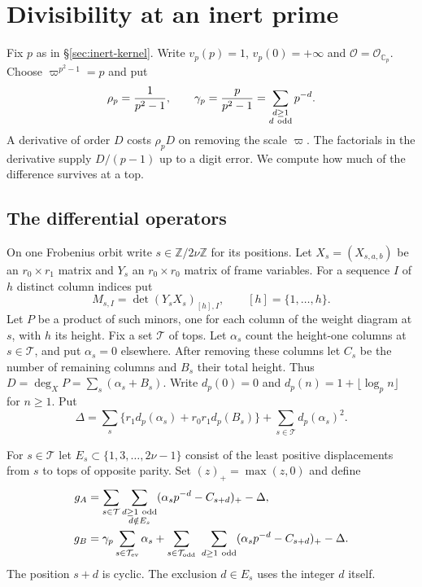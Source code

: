 \section{Divisibility at an inert prime}\label{sec:inert-divisibility}

Fix $p$ as in \S\ref{sec:inert-kernel}. Write $v_p(p)=1$,
$v_p(0)=+\infty$ and $\mathcal O=\mathcal O_{\mathbb C_p}$.
Choose $\varpi^{p^2-1}=p$ and put
\[
 \rho_p=\frac1{p^2-1},\qquad
 \gamma_p=\frac p{p^2-1}=\sum_{\substack{d\ge1\\d\ {\rm odd}}}p^{-d}.
\]
A derivative of order $D$ costs $\rho_pD$ on removing the scale
$\varpi$. The factorials in the derivative supply $D/(p-1)$ up to a
digit error. We compute how much of the difference survives at a top.

\subsection{The differential operators}

On one Frobenius orbit write $s\in\mathbb Z/2\nu\mathbb Z$ for its
positions. Let $X_s=(X_{s,a,b})$ be an $r_0\times r_1$ matrix and
$Y_s$ an $r_0\times r_0$ matrix of frame variables. For a sequence
$I$ of $h$ distinct column indices put
\[
 M_{s,I}=\det (Y_sX_s)_{[h],I},\qquad [h]=\{1,\ldots,h\}.
\]
Let $P$ be a product of such minors, one for each column of the weight
diagram at $s$, with $h$ its height. Fix a set $\mathcal T$ of tops.
Let $\alpha_s$ count the height-one columns at $s\in\mathcal T$, and
put $\alpha_s=0$ elsewhere. After removing these columns let $C_s$
be the number of remaining columns and $B_s$ their total height.
Thus $D=\deg_X P=\sum_s(\alpha_s+B_s)$. Write
$d_p(0)=0$ and $d_p(n)=1+\lfloor\log_p n\rfloor$ for $n\ge1$. Put
\[
 \Delta=\sum_s\{r_1d_p(\alpha_s)+r_0r_1d_p(B_s)\}
             +\sum_{s\in\mathcal T}d_p(\alpha_s)^2 .
\]

For $s\in\mathcal T$ let $E_s\subset\{1,3,\ldots,2\nu-1\}$ consist
of the least positive displacements from $s$ to tops of opposite parity.
Set $(z)_+=\max(z,0)$ and define
\begin{align}
 g_A&=\sum_{s\in\mathcal T}
       \sum_{\substack{d\ge1\ {\rm odd}\\d\notin E_s}}
       (\alpha_s p^{-d}-C_{s+d})_+-\Delta ,
       \label{eq:inert-base-gain}\\
 g_B&=\gamma_p\sum_{s\in\mathcal T_{\rm ev}}\alpha_s
       +\sum_{s\in\mathcal T_{\rm odd}}\ \sum_{d\ge1\ {\rm odd}}
       (\alpha_s p^{-d}-C_{s+d})_+-\Delta .
       \label{eq:inert-parity-gain}
\end{align}
The position $s+d$ is cyclic. The exclusion $d\in E_s$ uses the
integer $d$ itself.

